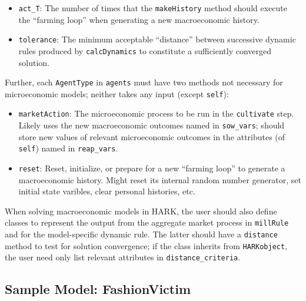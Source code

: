 \documentclass[12pt,titlepage,letterpaper]{econtex}
\begin{document}
{\begin{itemize}
\item \texttt{act\_T}: The number of times that the \texttt{makeHistory} method should execute the ``farming loop'' when generating a new macroeconomic history.

\item \texttt{tolerance}: The minimum acceptable ``distance'' between successive dynamic rules produced by \texttt{calcDynamics} to constitute a sufficiently converged solution.
\end{itemize}

Further, each \texttt{AgentType} in \texttt{agents} must have two methods not necessary for microeconomic models; neither takes any input (except \texttt{self}):
\begin{itemize}
\item \texttt{marketAction}: The microeconomic process to be run in the \texttt{cultivate} step.  Likely uses the new macroeconomic outcomes named in \texttt{sow\_vars}; should store new values of relevant microeconomic outcomes in the attributes (of \texttt{self}) named in \texttt{reap\_vars}.

\item \texttt{reset}: Reset, initialize, or prepare for a new ``farming loop'' to generate a macroeconomic history.  Might reset its internal random number generator, set initial state varibles, clear personal histories, etc.
\end{itemize}

When solving macroeconomic models in HARK, the user should also define classes to represent the output from the aggregate market process in \texttt{millRule} and for the model-specific dynamic rule.  The latter should have a \texttt{distance} method to test for solution convergence; if the class inherits from \texttt{HARKobject}, the user need only list relevant attributes in \texttt{distance\_criteria}.

\subsection{Sample Model: FashionVictim}\label{sec:FashionVictim}

}
\end{document}
